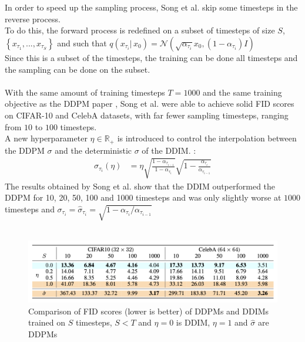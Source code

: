 \documentclass[twoside]{article}
\numberwithin{equation}{section}
\numberwithin{figure}{section}
\begin{document}
\\\\
In order to speed up the sampling process, Song et al. \cite{song2022denoising} skip some timesteps in the reverse process. \\
To do this, the forward process is redefined on a subset of timesteps of size $S$, $\left\{ x_{\tau_1}, ..., x_{\tau_S} \right\}$ and such that $q(x_{\tau_i} | \, x_0) = \mathcal{N}(\sqrt{\alpha_{\tau_i}} x_0, (1 - \alpha_{\tau_i})I)$ \\
Since this is a subset of the timesteps, the training can be done all timesteps and the sampling can be done on the subset. \cite{song2022denoising}
\\\\
With the same amount of training timesteps $T = 1000$ and the same training objective as the DDPM paper \cite{ho2020denoising}, Song et al. \cite{song2022denoising} were able to achieve solid FID scores on CIFAR-10 \cite{cifar10} and CelebA \cite{liu2015faceattributes} datasets, with far fewer sampling timesteps, ranging from $10$ to $100$ timesteps. \cite{song2022denoising} \\
A new hyperparameter $\eta \in \mathbb{R}_+$ is introduced to control the interpolation between the DDPM $\sigma$ and the deterministic $\sigma$ of the DDIM. \cite{song2022denoising}:
\begin{align}
  \sigma_{\tau_i} (\eta) &= \eta \sqrt{\frac{1 - \alpha_{\tau_{i-1}}}{1 - \alpha_{\tau_i}}} \sqrt{1 - \frac{\alpha_{\tau_i}}{\alpha_{\tau_{i-1}}}}
\end{align}
The results obtained by Song et al. \cite{song2022denoising} show that the DDIM outperformed the DDPM for 10, 20, 50, 100 and 1000 timesteps and was only slightly worse at $1000$ timesteps and $\sigma_{\tau_i} = \hat{\sigma}_{\tau_i} = \sqrt{1 - \alpha_{\tau_i} / \alpha_{\tau_{i-1}}}$
\\\\
\begin{figure}[h]
  \begin{center}
    \includegraphics[width=\textwidth]{images/ddim_table.png}
    \caption{Comparison of FID scores (lower is better) of DDPMs and DDIMs trained on $S$ timesteps, $S < T$ and $\eta = 0$ is DDIM, $\eta = 1$ and $\hat{\sigma}$ are DDPMs \cite{song2022denoising}}
  \end{center}
\end{figure}
\\\\
\end{document}
